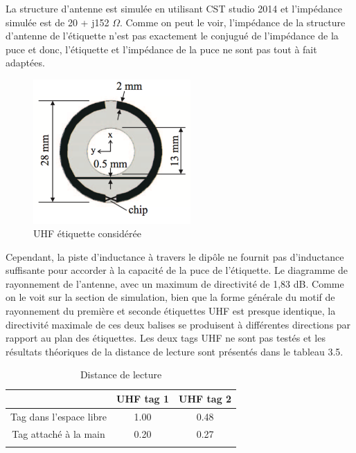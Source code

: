 \documentclass[11pt, a4paper, twoside]{book}
\begin{document}
 La structure d'antenne est simulée en utilisant CST studio 2014 et l'impédance simulée est de 20 + j152 \(\Omega\). Comme on peut le voir, l'impédance de la structure d'antenne de l'étiquette n'est pas exactement le conjugué de l'impédance de la puce \cite{alien} et donc, l'étiquette et l'impédance de la puce ne sont pas tout à fait adaptées.
\begin{figure}[H]
\centering
\includegraphics[width=6cm]{dofi}
\caption{UHF étiquette considérée}
\end{figure}

Cependant, la piste d'inductance à travers le dipôle ne fournit pas d'inductance suffisante pour accorder à la capacité de la puce de l'étiquette. Le diagramme de rayonnement de l'antenne, avec un maximum de directivité de 1,83 dB. Comme on le voit sur la section de simulation, bien que la forme générale du motif de rayonnement du première et seconde étiquettes UHF est presque identique, la directivité maximale de ces deux balises se produisent à différentes directions par rapport au plan des étiquettes. Les deux tags UHF ne sont pas testés et les résultats théoriques de la distance de lecture sont présentés dans le tableau 3.5.\\

\begin{longtable}[c]{| c | c | c |}
 \hline
  & UHF tag 1 & UHF tag 2 \\
 \hline
 Tag dans l'espace libre & 1.00 & 0.48\\
 \hline
 Tag attaché à la main  & 0.20 & 0.27\\
 \hline
\caption{Distance de lecture}
\end{longtable}
\end{document}
